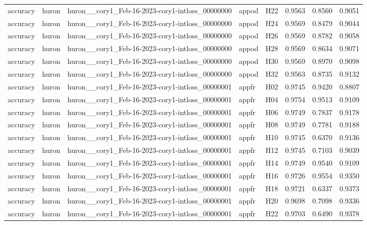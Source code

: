 \begin{table}[tbp]
\begin{tabular}{lllllrrr}
accuracy & huron & huron\_\_cory1\_Feb-16-2023-cory1-intloss\_00000000 & appod & H22 & 0.9563 & 0.8560 & 0.9051 \\
accuracy & huron & huron\_\_cory1\_Feb-16-2023-cory1-intloss\_00000000 & appod & H24 & 0.9569 & 0.8479 & 0.9044 \\
accuracy & huron & huron\_\_cory1\_Feb-16-2023-cory1-intloss\_00000000 & appod & H26 & 0.9569 & 0.8782 & 0.9058 \\
accuracy & huron & huron\_\_cory1\_Feb-16-2023-cory1-intloss\_00000000 & appod & H28 & 0.9569 & 0.8634 & 0.9071 \\
accuracy & huron & huron\_\_cory1\_Feb-16-2023-cory1-intloss\_00000000 & appod & H30 & 0.9569 & 0.8970 & 0.9098 \\
accuracy & huron & huron\_\_cory1\_Feb-16-2023-cory1-intloss\_00000000 & appod & H32 & 0.9563 & 0.8735 & 0.9132 \\
accuracy & huron & huron\_\_cory1\_Feb-16-2023-cory1-intloss\_00000001 & appfr & H02 & 0.9745 & 0.9420 & 0.8807 \\
accuracy & huron & huron\_\_cory1\_Feb-16-2023-cory1-intloss\_00000001 & appfr & H04 & 0.9754 & 0.9513 & 0.9109 \\
accuracy & huron & huron\_\_cory1\_Feb-16-2023-cory1-intloss\_00000001 & appfr & H06 & 0.9749 & 0.7837 & 0.9178 \\
accuracy & huron & huron\_\_cory1\_Feb-16-2023-cory1-intloss\_00000001 & appfr & H08 & 0.9749 & 0.7781 & 0.9188 \\
accuracy & huron & huron\_\_cory1\_Feb-16-2023-cory1-intloss\_00000001 & appfr & H10 & 0.9745 & 0.6370 & 0.9136 \\
accuracy & huron & huron\_\_cory1\_Feb-16-2023-cory1-intloss\_00000001 & appfr & H12 & 0.9745 & 0.7103 & 0.9039 \\
accuracy & huron & huron\_\_cory1\_Feb-16-2023-cory1-intloss\_00000001 & appfr & H14 & 0.9749 & 0.9540 & 0.9109 \\
accuracy & huron & huron\_\_cory1\_Feb-16-2023-cory1-intloss\_00000001 & appfr & H16 & 0.9726 & 0.9554 & 0.9350 \\
accuracy & huron & huron\_\_cory1\_Feb-16-2023-cory1-intloss\_00000001 & appfr & H18 & 0.9721 & 0.6337 & 0.9373 \\
accuracy & huron & huron\_\_cory1\_Feb-16-2023-cory1-intloss\_00000001 & appfr & H20 & 0.9698 & 0.7098 & 0.9336 \\
accuracy & huron & huron\_\_cory1\_Feb-16-2023-cory1-intloss\_00000001 & appfr & H22 & 0.9703 & 0.6490 & 0.9378 \\

\end{tabular}
\end{table}
